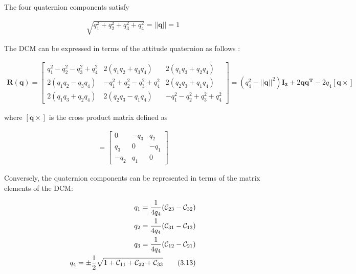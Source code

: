 \documentclass{article}
\begin{document}
\noindent The four quaternion components satisfy 

\begin{align}
    \sqrt{q_{1}^2 + q_{2}^2 + q_{3}^2 + q_{4}^2} = ||\mathbf{q}|| = 1 \tag{3.10}
\end{align}

\noindent The DCM can be expressed in terms of the attitude quaternion as follows \cite{wertz1978}:

\begin{align}
    \mathbf{R}(\mathbf{q}) = \left[ \begin{matrix}
        q_{1}^2 - q_{2}^2 - q_{3}^2 + q_{4}^2 & 2(q_{1}q_{2} + q_{3}q_{4}) & 2(q_{1}q_{3} + q_{2}q_{4}) \\ 
        2(q_{1}q_{2} - q_{3}q_{4}) & - q_{1}^2 + q_{2}^2 - q_{3}^2 + q_{4}^2 & 2(q_{2}q_{3} + q_{1}q_{4}) \\
        2(q_{1}q_{3} + q_{2}q_{4}) & 2(q_{2}q_{3} - q_{1}q_{4}) & - q_{1}^2 - q_{2}^2 + q_{3}^2 + q_{4}^2
    \end{matrix} \right] =  (q_{4}^2 - ||\mathbf{q}||^2) \mathbf{I_{3}} + 2  \mathbf{q} \mathbf{q^T} - 2 q_{4}[\mathbf{q} \times] \tag{3.11} 
\end{align}

\noindent where $\mathbf{[q \times]}$ is the cross product matrix defined as

\begin{align}
    [\mathbf{q \times}] = \left[ \begin{matrix}
        0 & -q_{3} & q_{2} \\ 
        q_{3} & 0 & -q_{1} \\
        -q_{2} & q_{1} & 0 
    \end{matrix} \right] \tag{3.12}
\end{align}

\noindent Conversely, the quaternion components can be represented in terms of the matrix elements of the DCM:

\begin{align}
    q_{1} = \frac{1}{4 q_{4}}(\mathcal{C}_{23} - \mathcal{C}_{32}) \notag \\
    q_{2} = \frac{1}{4 q_{4}}(\mathcal{C}_{31} - \mathcal{C}_{13}) \notag \\
    q_{3} = \frac{1}{4 q_{4}}(\mathcal{C}_{12} - \mathcal{C}_{21}) \notag \\
    q_{4} = \pm \frac{1}{2} \sqrt{ 1 + \mathcal{C}_{11} + \mathcal{C}_{22} + \mathcal{C}_{33} } \tag{3.13}
\end{align}
\end{document}
